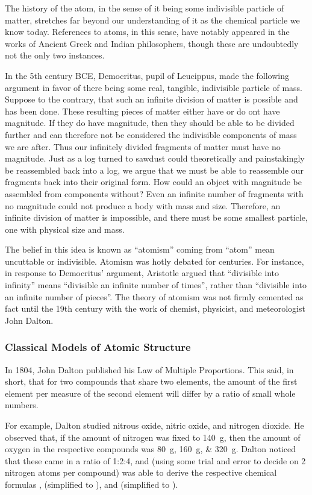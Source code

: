 The history of the atom, in the sense of it being some indivisible particle of matter, stretches far beyond our understanding of it as the chemical particle we know today. References to atoms, in this sense, have notably appeared in the works of Ancient Greek and Indian philosophers, though these are undoubtedly not the only two instances.

In the 5th century BCE, Democritus, pupil of Leucippus, made the following argument in favor of there being some real, tangible, indivisible particle of mass. Suppose to the contrary, that such an infinite division of matter is possible and has been done. These resulting pieces of matter either have or do ont have magnitude. If they do have magnitude, then they should be able to be divided further and can therefore not be considered the indivisible components of mass we are after. Thus our infinitely divided fragments of matter must have no magnitude. Just as a log turned to sawdust could theoretically and painstakingly be reassembled back into a log, we argue that we must be able to reassemble our fragments back into their original form. How could an object with magnitude be assembled from components without? Even an infinite number of fragments with no magnitude could not produce a body with mass and size. Therefore, an infinite division of matter is impossible, and there must be some smallest particle, one with physical size and mass.

The belief in this idea is known as ``atomism'' coming from ``atom'' mean uncuttable or indivisible. Atomism was hotly debated for centuries. For instance, in response to Democritus' argument, Aristotle argued that ``divisible into infinity'' means ``divisible an infinite number of times'', rather than ``divisible into an infinite number of pieces''. The theory of atomism was not firmly cemented as fact until the 19th century with the work of chemist, physicist, and meteorologist John Dalton.

\subsubsection{Classical Models of Atomic Structure}

In 1804, John Dalton published his Law of Multiple Proportions. This said, in short, that for two compounds that share two elements, the amount of the first element per measure of the second element will differ by a ratio of small whole numbers.

For example, Dalton studied nitrous oxide, nitric oxide, and nitrogen dioxide. He observed that, if the amount of nitrogen was fixed to \qty{140}{\gram}, then the amount of oxygen in the respective compounds was \qtylist{80;160;320}{\gram}. Dalton noticed that these came in a ratio of 1:2:4, and (using some trial and error to decide on \num{2} nitrogen atoms per compound) was able to derive the respective chemical formulas ,  (simplified to ), and  (simplified to ).

